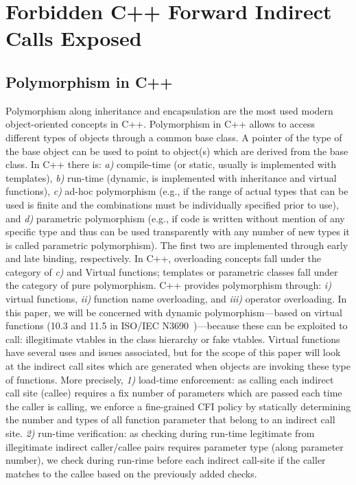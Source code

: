 \chapter{Forbidden C++ Forward Indirect Calls Exposed}
\label{C++ Bad Forward Indirect Calls}

\section{Polymorphism in C++}
\label{Late Binding in C++}
Polymorphism along inheritance and encapsulation
are the most used modern object-oriented concepts
in C++. 
Polymorphism in C++ allows to access different types of objects 
through a common base class. A pointer of the type of the base object
can be used to point to object(s) which are derived from the base class.
In C++ there is:
\textit{a)} compile-time (or static, usually is implemented with templates), 
\textit{b)} run-time (dynamic, is implemented with inheritance and virtual functions), 
\textit{c)} ad-hoc polymorphism (e.g., if the range of actual types that can be used 
is finite and the combinations must be individually specified prior to use), and
\textit{d)} parametric polymorphism (e.g., if code is written without mention of any 
specific type and thus can be used transparently with any number of new types it
is called parametric polymorphism). 
The first two are implemented through early 
and late binding, respectively.
In C++, overloading concepts fall under the category of \textit{c)} and Virtual functions;
templates or parametric classes fall under the category of pure polymorphism.
C++ provides polymorphism through: 
\textit{i)} virtual functions,
\textit{ii)} function name overloading, and 
\textit{iii)} operator overloading. 
In this paper, we will be concerned with dynamic 
polymorphism---based on virtual functions (10.3 and 11.5 in 
ISO/IEC N3690~\cite{iso:iecN3690})---because these can be exploited to 
call: illegitimate vtables in the class hierarchy 
or fake vtables.
Virtual functions have several uses and issues associated, 
but for the scope of this paper will look at the indirect 
call sites which are generated when objects are invoking these type
of functions. More precisely, 
\textit{1)} load-time enforcement: as calling each indirect call site (callee) requires 
a fix number of parameters which are passed each time the caller is calling, we
enforce a fine-grained CFI policy by statically determining the number and types of all function parameter
that belong to an indirect call site.
\textit{2)} run-time verification: as checking during run-time legitimate from
illegitimate indirect caller/callee pairs requires parameter type (along parameter number),
we check during run-rime before each indirect call-site if the caller matches to the callee 
based on the previously added checks.


